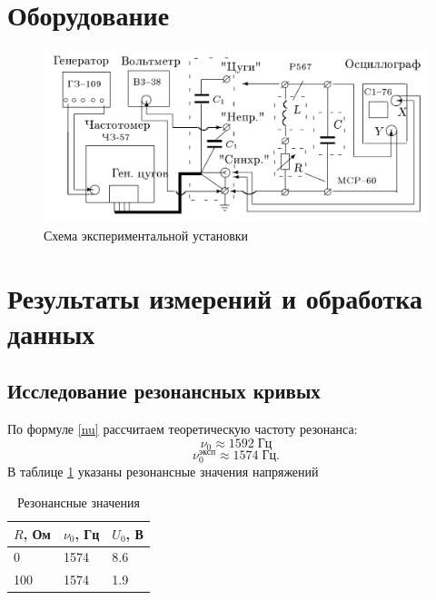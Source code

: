 \documentclass{lab}
\begin{document}
\section{Оборудование}
\begin{figure}[h!]
    \centering
    \includegraphics[width=1\linewidth]{Screenshot_2}
    \caption{Схема экспериментальной установки}
    \label{fig:set}
\end{figure}

\section{Результаты измерений и обработка данных}

\subsection{Исследование резонансных кривых}

По формуле \ref{nu} рассчитаем теоретическую частоту резонанса:
\begin{equation}
    \nu_0\approx 1592 \; \text{Гц}
\end{equation}
\begin{equation}
    \nu_0^\text{эксп} \approx 1574 \; \text{Гц}.
\end{equation}
В таблице \ref{res} указаны резонансные значения напряжений

\begin{table}[]
    \centering
    \begin{tabular}{|l|l|l|}
        \hline
        \textbf{$R$, Ом} & \textbf{$\nu_0$, Гц} & \textbf{$U_0$, В} \\ \hline
        0                & 1574                 & 8.6               \\ \hline
        100              & 1574                 & 1.9               \\ \hline
    \end{tabular}
    \caption{Резонансные значения}
    \label{res}
\end{table}
\end{document}
